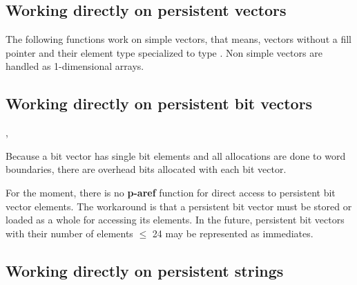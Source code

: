 \subsection[Persistent vectors]{Working directly on persistent
  vectors}

The following functions work on simple vectors, that means, vectors
without a fill pointer and their element type specialized to type
. Non simple vectors are handled as 1-dimensional arrays.

\begin{NarrowRefList}
\Allocator {}
\TypePredicate {}
\ObjectStore {}
\ObjectLoad {}
\SlotReader {}
\SlotWriter {}
\Information {}
\end{NarrowRefList}

\subsection[Persistent bit vectors]{Working directly on persistent bit
  vectors}

\begin{NarrowRefList}
\Allocator {}
\TypePredicate {}
\ObjectStore {}
\ObjectLoad {}
\Information {},
\end{NarrowRefList}
Because a bit vector has single bit elements and all allocations are
done to word boundaries, there are  overhead bits allocated with each bit
vector.

For the moment, there is no \textbf{p-aref} function for direct access
to persistent bit vector elements. The workaround is that a persistent
bit vector must be stored or loaded as a whole for accessing its
elements. In the future, persistent bit vectors with their number of
elements $\leq$ 24 may be represented as immediates.

\subsection[Persistent strings]{Working directly on persistent
  strings}

